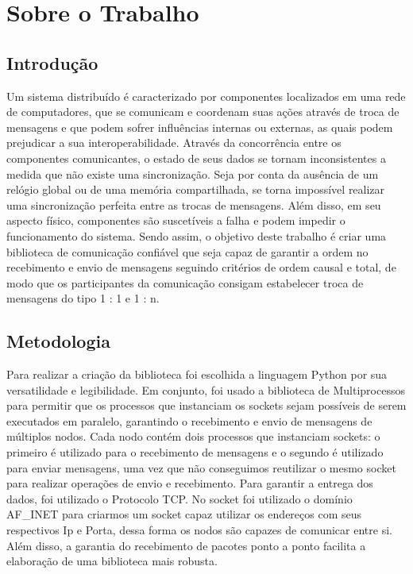 \documentclass[
	12pt,				%
	openright,			%
	oneside,			%
	a4paper,			%
	english,			%
	french,				%
	spanish,			%
	brazil				%
	]{abntex2}
\begin{document}


\chapter{Sobre o Trabalho}

\section{Introdução}
Um sistema distribuído é caracterizado por componentes localizados em uma rede de computadores,
que se comunicam e coordenam suas ações através de troca de mensagens e que podem sofrer
influências internas ou externas, as quais podem prejudicar a sua interoperabilidade. Através da
concorrência entre os componentes comunicantes, o estado de seus dados se tornam inconsistentes a medida que não existe uma sincronização.
Seja por conta da ausência de um relógio global ou de uma memória compartilhada, se torna impossível realizar uma sincronização perfeita
entre as trocas de mensagens. Além disso, em seu aspecto físico, componentes são suscetíveis a falha
e podem impedir o funcionamento do sistema. Sendo assim, o objetivo deste trabalho é criar uma
biblioteca de comunicação confiável que seja capaz de garantir a ordem no recebimento e envio
de mensagens seguindo critérios de ordem causal e total, de modo que os participantes
da comunicação consigam estabelecer troca de mensagens do tipo 1 : 1 e 1 : n. 

\section{Metodologia}
Para realizar a criação da biblioteca foi escolhida a linguagem Python por sua versatilidade
e legibilidade. Em conjunto, foi usado a biblioteca de Multiprocessos para permitir que os processos
que instanciam os sockets sejam possíveis de serem executados em paralelo,
garantindo o recebimento e envio de mensagens de múltiplos nodos.
Cada nodo contém dois processos que instanciam sockets: o primeiro é utilizado para o recebimento de mensagens
e o segundo é utilizado para enviar mensagens, uma vez que não conseguimos reutilizar o mesmo socket para realizar
operações de envio e recebimento. Para garantir a entrega dos dados, foi utilizado o Protocolo TCP.  
No socket foi utilizado o domínio AF\_INET para criarmos um socket capaz utilizar os endereços com seus respectivos Ip e Porta,
dessa forma os nodos são capazes de comunicar entre si. Além disso,
a garantia do recebimento de pacotes ponto a ponto facilita a elaboração de uma biblioteca
mais robusta.
\end{document}
